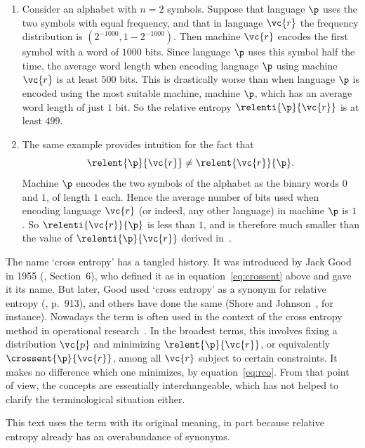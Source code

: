\begin{examples}
\begin{enumerate}
\item
{}
Consider an alphabet with $n = 2$ symbols.  Suppose that language $\p$ uses
the two symbols with equal frequency, and that in language $\vc{r}$ the
frequency distribution is $(2^{-1000}, 1 - 2^{-1000})$.  Then machine
$\vc{r}$ encodes the first symbol with a word of $1000$ bits.  Since
language $\p$ uses this symbol half the time, the average word length when
encoding language $\p$ using machine $\vc{r}$ is at least $500$ bits.  This
is drastically worse than when language $\p$ is encoded using the most
suitable machine, machine $\p$, which has an average word length of just
$1$ bit.  So the relative entropy $\relenti{\p}{\vc{r}}$ is at least $499$.

\item
The same example provides intuition for the fact that
\[
\relent{\p}{\vc{r}} \neq \relent{\vc{r}}{\p}.
\]
Machine $\p$ encodes the two symbols of the alphabet as the binary words
$0$ and $1$, of length $1$ each.  Hence the average number of bits used when
encoding language $\vc{r}$ (or indeed, any other language) in machine $\p$
is $1$.  So $\relenti{\vc{r}}{\p}$ is less than $1$, and is therefore much
smaller than the value of $\relenti{\p}{\vc{r}}$ derived
in~.
\end{enumerate}
\end{examples}

\begin{remark}
% 
The name `cross entropy' has a tangled history.  It was introduced by Jack
Good%
%
% 
in 1955 (\cite{GoodSTN}, Section~6), who defined it as in
equation~\eqref{eq:crossent} above and gave it its name.  But later, Good
used `cross entropy' as a synonym for relative entropy (\cite{GoodMEH},
p.~913), and others have done the same (Shore and Johnson~\cite{ShJo}, for
instance).  Nowadays the term is often used in the context of the cross
entropy method in operational research~\cite{DKMR}.  In the broadest terms,
this involves fixing a distribution $\vc{p}$ and minimizing
$\relent{\p}{\vc{r}}$, or equivalently $\crossent{\p}{\vc{r}}$, among all
$\vc{r}$ subject to certain constraints.  It makes no difference which one
minimizes, by equation~\eqref{eq:rco}.  From that point of view, the
concepts are essentially interchangeable, which has not helped to clarify
the terminological situation either.

This text uses the term with its original meaning, in part because relative
entropy already has an overabundance of synonyms.
\end{remark}

